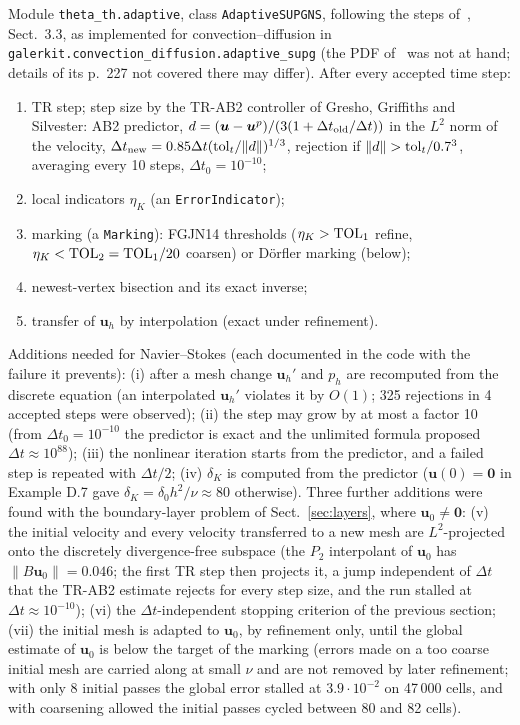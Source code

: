 \documentclass[11pt,a4paper]{article}
\newcommand{\bu}{\boldsymbol{u}}
\newcommand{\dt}{\Delta t}
\newcommand{\code}[1]{\texttt{#1}}
\begin{document}
Module \code{theta\_th.adaptive}, class \code{AdaptiveSUPGNS}, following the steps of~\cite{FGJN14}, Sect.~3.3, as
implemented for convection--diffusion in \code{galerkit.convection\_diffusion.adaptive\_supg} (the PDF of~\cite{FGJN14}
was not at hand; details of its p.~227 not covered there may differ). After every accepted time step:
\begin{enumerate}
\item TR step; step size by the TR-AB2 controller of Gresho, Griffiths and Silvester: AB2 predictor,
  $d=(\bu-\bu^p)/(3(1+\dt_{\rm old}/\dt))$ in the $L^2$ norm of the velocity, $\dt_{\rm new}=0.85\dt({\rm tol}_t/\|d\|)^{1/3}$,
  rejection if $\|d\|>{\rm tol}_t/0.7^3$, averaging every 10 steps, $\dt_0=10^{-10}$;
\item local indicators $\eta_K$ (an \code{ErrorIndicator});
\item marking (a \code{Marking}): FGJN14 thresholds ($\eta_K>{\rm TOL}_1$ refine, $\eta_K<{\rm TOL}_2={\rm TOL}_1/20$ coarsen) or
  D\"orfler marking (below);
\item newest-vertex bisection and its exact inverse;
\item transfer of $\bu_h$ by interpolation (exact under refinement).
\end{enumerate}
Additions needed for Navier--Stokes (each documented in the code with the failure it prevents):
(i) after a mesh change $\bu_h'$ and $p_h$ are recomputed from the discrete equation (an interpolated $\bu_h'$ violates it
by $O(1)$; 325 rejections in 4 accepted steps were observed); (ii) the step may grow by at most a factor 10 (from
$\dt_0=10^{-10}$ the predictor is exact and the unlimited formula proposed $\dt\approx10^{88}$); (iii) the nonlinear
iteration starts from the predictor, and a failed step is repeated with $\dt/2$; (iv) $\delta_K$ is computed from the
predictor ($\bu(0)=\boldsymbol0$ in Example D.7 gave $\delta_K=\delta_0h^2/\nu\approx80$ otherwise).
Three further additions were found with the boundary-layer problem of Sect.~\ref{sec:layers}, where $\bu_0\neq\boldsymbol0$:
(v) the initial velocity and every velocity transferred to a new mesh are $L^2$-projected onto the discretely
divergence-free subspace (the $P_2$ interpolant of $\bu_0$ has $\|B\bu_0\|=0.046$; the first TR step then projects it, a
jump independent of $\dt$ that the TR-AB2 estimate rejects for every step size, and the run stalled at
$\dt\approx10^{-10}$); (vi) the $\dt$-independent stopping criterion of the previous section; (vii) the initial mesh is
adapted to $\bu_0$, by refinement only, until the global estimate of $\bu_0$ is below the target of the marking (errors
made on a too coarse initial mesh are carried along at small $\nu$ and are not removed by later refinement; with only 8
initial passes the global error stalled at $3.9\cdot10^{-2}$ on 47\,000 cells, and with coarsening allowed the initial
passes cycled between 80 and 82 cells).
\end{document}
